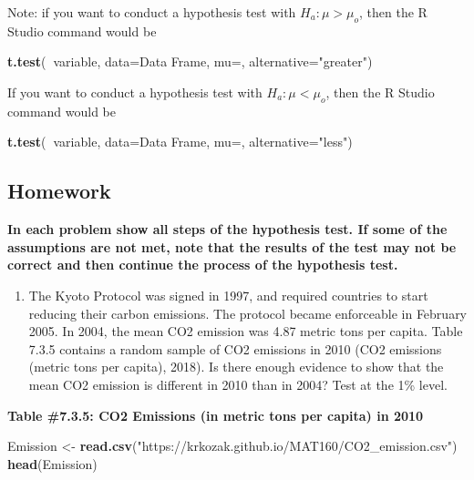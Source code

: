 \documentclass[
]{book}
\newenvironment{Shaded}{\begin{snugshade}}{\end{snugshade}}
\newcommand{\DataTypeTok}[1]{\textcolor[rgb]{0.13,0.29,0.53}{#1}}
\newcommand{\KeywordTok}[1]{\textcolor[rgb]{0.13,0.29,0.53}{\textbf{#1}}}
\newcommand{\NormalTok}[1]{#1}
\newcommand{\OperatorTok}[1]{\textcolor[rgb]{0.81,0.36,0.00}{\textbf{#1}}}
\newcommand{\StringTok}[1]{\textcolor[rgb]{0.31,0.60,0.02}{#1}}
\providecommand{\tightlist}{%
  \setlength{\itemsep}{0pt}\setlength{\parskip}{0pt}}
\begin{document}
Note: if you want to conduct a hypothesis test with \(H_a:\mu>\mu_o\), then the R Studio command would be

\begin{Shaded}
\begin{Highlighting}[]
\KeywordTok{t.test}\NormalTok{(}\OperatorTok{~}\NormalTok{variable, }\DataTypeTok{data=}\NormalTok{Data Frame, }\DataTypeTok{mu=}\NormalTok{, }\DataTypeTok{alternative=}\StringTok{"greater"}\NormalTok{)}
\end{Highlighting}
\end{Shaded}

If you want to conduct a hypothesis test with \(H_a:\mu<\mu_o\), then the R Studio command would be

\begin{Shaded}
\begin{Highlighting}[]
\KeywordTok{t.test}\NormalTok{(}\OperatorTok{~}\NormalTok{variable, }\DataTypeTok{data=}\NormalTok{Data Frame, }\DataTypeTok{mu=}\NormalTok{, }\DataTypeTok{alternative=}\StringTok{"less"}\NormalTok{)}
\end{Highlighting}
\end{Shaded}

\hypertarget{homework-18}{%
\subsection{Homework}\label{homework-18}}

\textbf{In each problem show all steps of the hypothesis test. If some of the assumptions are not met, note that the results of the test may not be correct and then continue the process of the hypothesis test.}

\begin{enumerate}
\def\labelenumi{\arabic{enumi}.}
\tightlist
\item
  The Kyoto Protocol was signed in 1997, and required countries to start reducing their carbon emissions. The protocol became enforceable in February 2005. In 2004, the mean CO2 emission was 4.87 metric tons per capita. Table 7.3.5 contains a random sample of CO2 emissions in 2010 (CO2 emissions (metric tons per capita), 2018). Is there enough evidence to show that the mean CO2 emission is different in 2010 than in 2004? Test at the 1\% level.
\end{enumerate}

\textbf{Table \#7.3.5: CO2 Emissions (in metric tons per capita) in 2010}

\begin{Shaded}
\begin{Highlighting}[]
\NormalTok{Emission <-}\StringTok{ }\KeywordTok{read.csv}\NormalTok{(}\StringTok{"https://krkozak.github.io/MAT160/CO2_emission.csv"}\NormalTok{)}
\KeywordTok{head}\NormalTok{(Emission)}
\end{Highlighting}
\end{Shaded}
\end{document}
